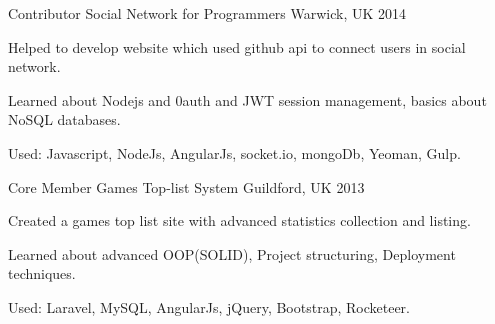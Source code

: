 

\begin{cventries}


  \cventry
    {Contributor} %
    {Social Network for Programmers} %
    {Warwick, UK} %
    {2014} %
    {
      \begin{cvitems} %
        \item {Helped to develop website which used github api to connect users in social network.}
        \item {Learned about Nodejs and 0auth and JWT session management, basics about NoSQL databases.}
        \item {Used: Javascript, NodeJs, AngularJs, socket.io, mongoDb, Yeoman, Gulp.}
      \end{cvitems}
    }

  \cventry
    {Core Member} %
    {Games Top-list System} %
    {Guildford, UK} %
    {2013} %
    {
      \begin{cvitems} %
        \item {Created a games top list site with advanced statistics collection and listing.}
        \item {Learned about advanced OOP(SOLID), Project structuring, Deployment techniques.}
        \item {Used: Laravel, MySQL, AngularJs, jQuery, Bootstrap, Rocketeer.}
      \end{cvitems}
    }


\end{cventries}
